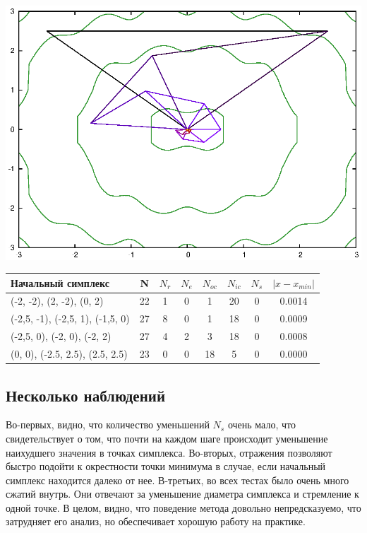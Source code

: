 \documentclass[12pt]{article}
\theoremstyle{plain}
\theoremstyle{remark}
\theoremstyle{definition}
\begin{document}
\includegraphics[scale=0.6]{ackley4.eps}


\begin{tabular}{|l| c| c| c| c| c| c| c|}
\hline
  Начальный симплекс &N & $N_r$ & $N_e$ & $N_{oc}$ & $N_{ic}$ & $N_s$ & $\left| x - x_{min} \right|$ \\
\hline
 (-2, -2), (2, -2), (0, 2) & 22 & 1 & 0 & 1 & 20& 0 & 0.0014 \\
(-2,5, -1), (-2,5, 1), (-1,5, 0) & 27  &8 & 0 & 1 & 18 & 0 &0.0009 \\
(-2,5, 0), (-2, 0), (-2, 2) & 27  &4 &2 &3 &18 &0 & 0.0008 \\
(0, 0), (-2.5, 2.5), (2.5, 2.5) & 23  &0 &0 &18 &5 &0 & 0.0000 \\
\hline
\end{tabular}

\vspace{0.8cm}

\subsection{Несколько наблюдений}

Во-первых, видно, что количество уменьшений $N_s$ очень мало, что свидетельствует о том, что почти на каждом шаге происходит уменьшение наихудшего значения в точках симплекса. Во-вторых, отражения позволяют быстро подойти к окрестности точки минимума в случае, если начальный симплекс находится далеко от нее. В-третьих, во всех тестах было очень много сжатий внутрь. Они отвечают за уменьшение диаметра симплекса и стремление к одной точке. В целом, видно, что поведение метода довольно непредсказуемо, что затрудняет его анализ, но обеспечивает хорошую работу на практике.

\nocite{*}



\end{document}
